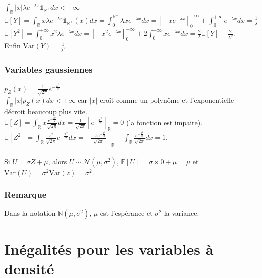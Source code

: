 \documentclass[a4paper,10pt]{book} %
\newcommand{\R}{\mathbb{R}}
\newcommand{\N}{\mathbb{N}}
\newcommand{\E}{\mathbb{E}} %
\newcommand\abs[1]{\left|#1\right|}
\newcommand{\indi}{\mathds{1}} %
\newcommand{\Var}{\mathrm{Var}} %
\newcommand{\Nor}{\mathcal{N}} %
\begin{document}
$\displaystyle \int_\R \abs{x}\lambda e^{-\lambda x }\indi_{\R^+}dx < +\infty$\\

$\displaystyle \E[Y] = \int_\R x \lambda e^{-\lambda x} \indi_{\R^+}(x)dx = \int_0^{\R^+} \lambda x e^{-\lambda x}dx = \left[-x e ^{-\lambda x}\right]_0^{+\infty} + \int_0^{+\infty}e^{-\lambda x }dx = \frac{1}{\lambda}$\\

$\displaystyle \E[Y^2] = \int_0^{+\infty} x^2 \lambda e^{-\lambda x}dx = \left[-x^2e^{-\lambda x}\right]_0^{+\infty} + 2\int_0^{+\infty} xe^{-\lambda x}dx = \frac{2}{\lambda}\E[Y] - \frac{2}{\lambda^2}$.\\

Enfin $\Var(Y)= \frac{1}{\lambda^2}$.

\subsubsection{Variables gaussiennes}
$\displaystyle p_Z(x) = \frac{1}{\sqrt{2\pi}}e^{-\frac{x^2}{2}}$\\

$\displaystyle \int_\R \abs{x}p_Z(x)dx < +\infty$ car $\abs{x}$ croît comme un polynôme et l'exponentielle décroit beaucoup plus vite.\\

$\displaystyle \E[Z] = \int_\R x\frac{e^{-\frac{x^2}{2}}}{\sqrt{2\pi}}dx = \frac{1}{\sqrt{2\pi}}[e^{-\frac{x^2}{2}}]_\R = 0$ (la fonction est impaire).\\

$\displaystyle \E[Z^2] = \int_\R \frac{x^2}{\sqrt{2\pi}} e^{-\frac{x^2}{2}}dx = \left[\frac{-xe^{-\frac{x^2}{2}}}{\sqrt{2\pi}}\right]_\R + \int_\R \frac{e^{-\frac{x^2}{2}}}{\sqrt{2\pi}}dx = 1$.\\\\

Si $U = \sigma Z + \mu$, alors $U\sim \Nor (\mu, \sigma^2)$, $\E[U]=\sigma \times 0  + \mu =\mu$ et $\Var(U) = \sigma^2 \Var(z) = \sigma^2$.

\subsubsection{Remarque}
Dans la notation $\N(\mu, \sigma^2)$, $\mu$ est l'espérance et $\sigma^2$ la variance.

\newpage

\section{Inégalités pour les variables à densité}
\end{document}
